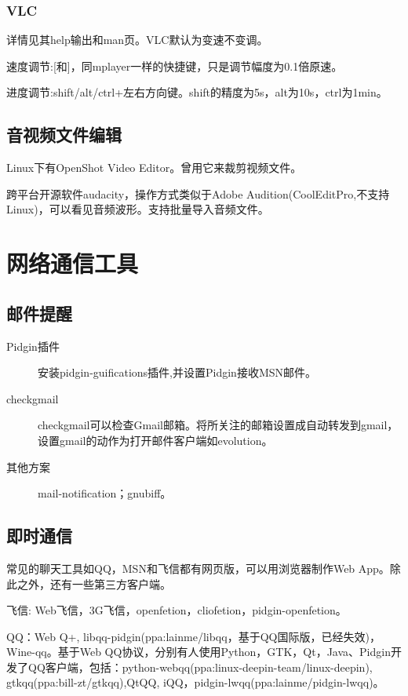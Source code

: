 \subsubsection{VLC}
详情见其help输出和man页。VLC默认为变速不变调。

速度调节:[和]，同mplayer一样的快捷键，只是调节幅度为0.1倍原速。

进度调节:shift/alt/ctrl+左右方向键。shift的精度为5s，alt为10s，ctrl为1min。


\subsection{音视频文件编辑}
Linux下有OpenShot Video Editor。曾用它来裁剪视频文件。

跨平台开源软件audacity，操作方式类似于Adobe Audition(CoolEditPro,不支持Linux)，可以看见音频波形。支持批量导入音频文件。

\section{网络通信工具}

\subsection{邮件提醒}

\begin{description}
    \item[Pidgin插件]安装pidgin-guifications插件,并设置Pidgin接收MSN邮件。
    \item[checkgmail]checkgmail可以检查Gmail邮箱。将所关注的邮箱设置成自动转发到gmail，设置gmail的动作为打开邮件客户端如evolution。
    \item[其他方案]mail-notification；gnubiff。
\end{description}

\subsection{即时通信}

常见的聊天工具如QQ，MSN和飞信都有网页版，可以用浏览器制作Web App。除此之外，还有一些第三方客户端。

飞信: Web飞信，3G飞信，openfetion，cliofetion，pidgin-openfetion。

QQ：Web Q+, libqq-pidgin(ppa:lainme/libqq，基于QQ国际版，已经失效)，Wine-qq。基于Web QQ协议，分别有人使用Python，GTK，Qt，Java、Pidgin开发了QQ客户端，包括：python-webqq(ppa:linux-deepin-team/linux-deepin), gtkqq(ppa:bill-zt/gtkqq),QtQQ, iQQ，pidgin-lwqq(ppa:lainme/pidgin-lwqq)。

